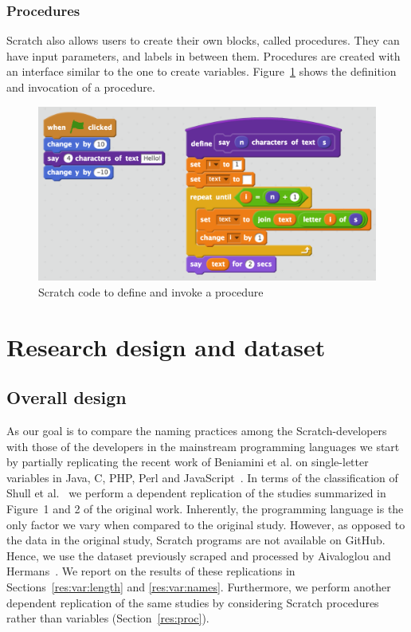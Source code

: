 \documentclass[conference]{IEEEtran}
\begin{document}
\subsubsection{Procedures} \label {sec:Scratch_func}
Scratch also allows users to create their own blocks, called procedures. They can have input parameters, and labels in between them. Procedures are created with an interface similar to the one to create variables. Figure~\ref{fig:procedures} shows the definition and invocation of a procedure.

\begin{figure}
  \begin{center}
  \includegraphics[width=\columnwidth]{fig/procedures2.png}
  \caption{Scratch code to define and invoke a procedure}
  \label{fig:procedures}
  \end{center}
\end{figure} 


\section{Research design and dataset}
\subsection{Overall design}
\label{sec:design}
As our goal is to compare the naming practices among the Scratch-developers with those of the developers in the mainstream programming languages we start by partially replicating the recent work of Beniamini et al. on single-letter variables in Java, C, PHP, Perl and JavaScript~\cite{Beniamini}. 
In terms of the classification of Shull et al.~\cite{Shull2008} we perform a dependent replication of the studies summarized in Figure~1 and 2 of the original work.  
Inherently, the programming language is the only factor we vary when compared to the original study. 
However, as opposed to the data in the original study, Scratch programs are not available on GitHub. 
Hence, we use the dataset previously scraped and processed by Aivaloglou and Hermans~\cite{Aivaloglou2016HowKC}. 
We report on the results of these replications in Sections~\ref{res:var:length} and \ref{res:var:names}.
%
Furthermore, we perform another dependent replication of the same studies by considering Scratch procedures rather than variables (Section~\ref{res:proc}).
\end{document}
